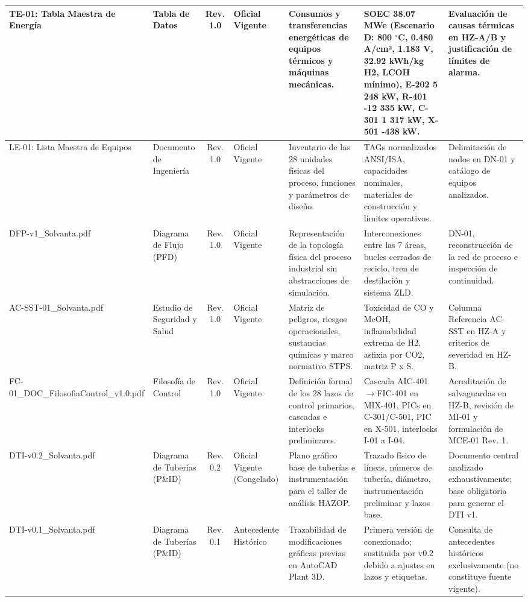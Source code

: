 \documentclass[10pt,letterpaper]{article}
\begin{document}
\begin{landscape}
\begin{xltabular}{\linewidth}{|p{3.8cm}|p{2.4cm}|c|p{2.2cm}|>{\raggedright\arraybackslash}X|>{\raggedright\arraybackslash}X|p{3.0cm}|}
TE-01: Tabla Maestra de Energía & Tabla de Datos & Rev. 1.0 & Oficial Vigente & Consumos y transferencias energéticas de equipos térmicos y máquinas mecánicas. & SOEC 38.07 MWe (Escenario D: 800 $^\circ$C, 0.480 A/cm², 1.183 V, 32.92 kWh/kg H2, LCOH mínimo), E-202 5 248 kW, R-401 -12 335 kW, C-301 1 317 kW, X-501 -438 kW. & Evaluación de causas térmicas en HZ-A/B y justificación de límites de alarma. \\ \hline
LE-01: Lista Maestra de Equipos & Documento de Ingeniería & Rev. 1.0 & Oficial Vigente & Inventario de las 28 unidades físicas del proceso, funciones y parámetros de diseño. & TAGs normalizados ANSI/ISA, capacidades nominales, materiales de construcción y límites operativos. & Delimitación de nodos en DN-01 y catálogo de equipos analizados. \\ \hline
DFP-v1\_\allowbreak Solvanta.pdf & Diagrama de Flujo (PFD) & Rev. 1.0 & Oficial Vigente & Representación de la topología física del proceso industrial sin abstracciones de simulación. & Interconexiones entre las 7 áreas, bucles cerrados de reciclo, tren de destilación y sistema ZLD. & DN-01, reconstrucción de la red de proceso e inspección de continuidad. \\ \hline
AC-SST-01\_\allowbreak Solvanta.pdf & Estudio de Seguridad y Salud & Rev. 1.0 & Oficial Vigente & Matriz de peligros, riesgos operacionales, sustancias químicas y marco normativo STPS. & Toxicidad de CO y MeOH, inflamabilidad extrema de H2, asfixia por CO2, matriz P x S. & Columna Referencia AC-SST en HZ-A y criterios de severidad en HZ-B. \\ \hline
FC-01\_\allowbreak DOC\_\allowbreak FilosofiaControl\_\allowbreak v1.0.pdf & Filosofía de Control & Rev. 1.0 & Oficial Vigente & Definición formal de los 28 lazos de control primarios, cascadas e interlocks preliminares. & Cascada AIC-401$\to$FIC-401 en MIX-401, PICs en C-301/C-501, PIC en X-501, interlocks I-01 a I-04. & Acreditación de salvaguardas en HZ-B, revisión de MI-01 y formulación de MCE-01 Rev. 1. \\ \hline
DTI-v0.2\_\allowbreak Solvanta.pdf & Diagrama de Tuberías (P\&ID) & Rev. 0.2 & Oficial Vigente (Congelado) & Plano gráfico base de tuberías e instrumentación para el taller de análisis HAZOP. & Trazado físico de líneas, números de tubería, diámetro, instrumentación preliminar y lazos base. & Documento central analizado exhaustivamente; base obligatoria para generar el DTI v1. \\ \hline
DTI-v0.1\_\allowbreak Solvanta.pdf & Diagrama de Tuberías (P\&ID) & Rev. 0.1 & Antecedente Histórico & Trazabilidad de modificaciones gráficas previas en AutoCAD Plant 3D. & Primera versión de conexionado; sustituida por v0.2 debido a ajustes en lazos y etiquetas. & Consulta de antecedentes históricos exclusivamente (no constituye fuente vigente). \\ \hline

\end{xltabular}
\end{landscape}
\end{document}
